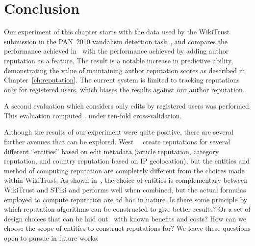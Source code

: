 \section{Conclusion}

Our experiment of this chapter starts with the data used by the
WikiTrust submission in the PAN~2010 vandalism detection
task~\cite{Adler2010b}, and compares the performance achieved
in~\cite{Potthast2010b}
with the performance achieved by adding author reputation as a feature.
The result is a notable increase in predictive ability, demonstrating
the value of maintaining author reputation scores as described in
Chapter~\ref{ch:reputation}.
The current system is limited to tracking reputations only for
registered users, which biases the results against our author reputation.

A second evaluation which considers only edits by registered users
was performed.
This evaluation computed .
under ten-fold cross-validation.

Although the results of our experiment were quite positive, there are
several further avenues that can be explored.
West~\etal~\cite{West2010} create reputations for several different
``entities'' based on edit metadata (\eg article reputation, category
reputation, and country reputation based on IP geolocation), but the
entities and method of computing reputation are completely different
from the choices made within WikiTrust.
As shown in~\cite{Adler2011a}, the choice of entities is complementary
between WikiTrust and STiki and performs well when combined, but the
actual formulas employed to compute reputation are ad hoc in nature.
Is there some principle by which reputation algorithms can be
constructed to give better results?
Or a set of design choices that can be laid out~\cite{Adler2011b} with
known benefits and costs?
How can we choose the scope of entities to construct reputations for?
We leave these questions open to pursue in future works.


